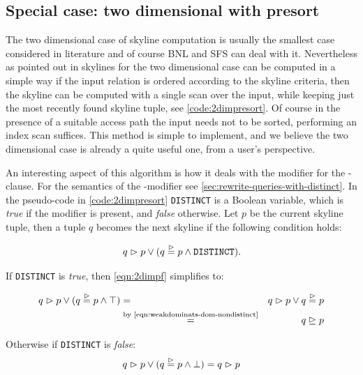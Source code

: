 \subsection{Special case: two dimensional with presort}
\label{sec:presort}
The two dimensional case of skyline computation is usually the
smallest case considered in literature and of course BNL and SFS can
deal with it.  Nevertheless as pointed out in \citep{Borzsonyi2001}
skylines for the two dimensional case can be computed in a simple way
if the input relation is ordered according to the skyline criteria,
then the skyline can be computed with a single scan over the
input, while keeping just the most recently found skyline tuple, see
\autoref{code:2dimpresort}.  Of course in the presence of a
suitable access path the input needs not to be sorted, performing an
index scan suffices.  This method is simple to implement, and we believe the
two dimensional case is already a quite useful one, from a user's
perspective.

An interesting aspect of this algorithm is how it deals with the
 modifier for the -clause.
%
For the semantics of the -modifier see
\autoref{sec:rewrite-queries-with-distinct}.
%
In the pseudo-code in \autoref{code:2dimpresort} \texttt{DISTINCT}
is a Boolean variable, which is \emph{true} if the
 modifier is present, and \emph{false}
otherwise. Let $p$ be the current skyline tuple, then a tuple $q$
becomes the next skyline if the following condition holds:

\begin{equation}\label{eqn:2dimpf}
q \vartriangleright p \lor (q \stackrel{\vartriangleright}{=} p \land \text{\texttt{DISTINCT}}).
\end{equation}

\noindent
If \texttt{DISTINCT} is \emph{true}, then \eqref{eqn:2dimpf} simplifies to:

\begin{eqnarray}
q \vartriangleright p \lor (q \stackrel{\vartriangleright}{=} p \land \top) &=& q \vartriangleright p \lor q \stackrel{\vartriangleright}{=} p \nonumber\\
&\stackrel{\textnormal{by \eqref{eqn:weakdominats-dom-nondistinct}}}{=}& q \trianglerighteq p
\end{eqnarray}

\noindent
Otherwise if \texttt{DISTINCT} is \emph{false}:
%
\begin{equation}
q \vartriangleright p \lor (q \stackrel{\vartriangleright}{=} p \land \bot) = q \vartriangleright p
\end{equation}

